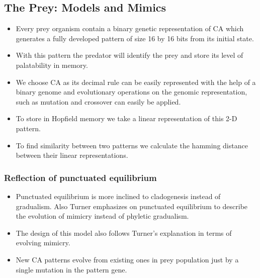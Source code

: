 \documentclass[a0,portrait]{a0poster}
\begin{document}
\begin{multicols}{2}
\color{DarkSlateGray}
\subsection*{The Prey: Models and Mimics}

\begin{itemize}
	\item Every prey organism contain a binary genetic representation of CA which generates a fully developed pattern of size 16 by 16 bits from its initial state.
	\item With this pattern the predator will identify the prey and store its level of palatability in memory. 
	\item We choose CA as its decimal rule can be easily represented with the help of a binary genome and evolutionary operations on the genomic representation, such as mutation and crossover can easily be applied. 
	\item To store in Hopfield memory we take a linear representation of this 2-D pattern.
	\item To find similarity between two patterns we calculate the hamming distance between their linear representations.
\end{itemize}

\color{SaddleBrown} 
\subsubsection*{Reflection of punctuated equilibrium}
\label{subsubsec:reflection-of-punctuated-equilibrium}

\begin{itemize}
	\item Punctuated equilibrium is more inclined to cladogenesis instead of gradualism. Also Turner \citep{turner1988} emphasizes on punctuated equilibrium to describe the evolution of mimicry instead of phyletic gradualism. 
	\item The design of this model also follows Turner's explanation in terms of evolving mimicry.
	\item New CA patterns evolve from existing ones in prey population just by a single mutation in the pattern gene. 
\end{itemize}


\end{multicols}
\end{document}
